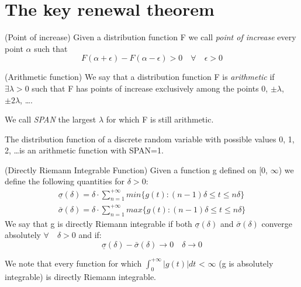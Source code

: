 \section{The key renewal theorem}
\begin{definition}
	(Point of increase) Given a distribution function F we call \textit{point of increase} every point $\alpha$ such that
	\begin{equation}
		F(\alpha+\epsilon)-F(\alpha-\epsilon)>0 \quad  \forall \quad
		\epsilon > 0
	\end{equation}
\end{definition}
\begin{definition}
	(Arithmetic function) We say that a distribution function F is \textit{arithmetic} if $\exists \lambda > 0$ such that F has points of increase exclusively among the points 0, $\pm \lambda$, $\pm 2\lambda$, \dots .

	We call \textit{SPAN} the largest $\lambda$ for which F is still arithmetic.
\end{definition}

The distribution function of a discrete random variable with possible values 0, 1, 2, \dots is an arithmetic function with SPAN=1.

\begin{definition}
	(Directly Riemann Integrable Function) Given a function g defined on [0, $\infty$) we define the following quantities for $\delta > 0$:
	\begin{align*}
		\underline \sigma (\delta) = \delta \cdot \sum_{n=1}^{+\infty} min\{g(t):(n-1)\delta \leq t \leq n \delta \}
		\\
		\bar \sigma (\delta) = \delta \cdot \sum_{n=1}^{+\infty}max\{g(t):(n-1)\delta \leq t \leq n \delta \}
	\end{align*}
	We say that g is directly Riemann integrable if both $\underline \sigma (\delta)$ and $\bar \sigma (\delta)$ converge absolutely $\forall \quad \delta > 0$ and if:
	\begin{equation}
		\underline \sigma (\delta) - \bar \sigma (\delta) \rightarrow 0 \quad \delta \rightarrow 0
		\end{equation}
\end{definition}

We note that every function for which $\int_{0}^{+\infty} |g(t)| dt$ < $\infty$ (g is absolutely integrable) is directly Riemann integrable.

